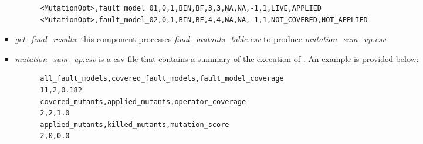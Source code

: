\begin{itemize}
\begin{itemize}
\begin{itemize}
      \begin{lstlisting}
      <MutationOpt>,fault_model_01,0,1,BIN,BF,3,3,NA,NA,-1,1,LIVE,APPLIED
      <MutationOpt>,fault_model_02,0,1,BIN,BF,4,4,NA,NA,-1,1,NOT_COVERED,NOT_APPLIED
      \end{lstlisting}

      \item \textit{get\_final\_results}: this component processes \textit{final\_mutants\_table.csv} to produce \textit{mutation\_sum\_up.csv}
      \item \textit{mutation\_sum\_up.csv} is a csv file that contains a summary of the execution of \dama.
      An example is provided below:

      \begin{lstlisting}
      all_fault_models,covered_fault_models,fault_model_coverage
      11,2,0.182
      covered_mutants,applied_mutants,operator_coverage
      2,2,1.0
      applied_mutants,killed_mutants,mutation_score
      2,0,0.0
      \end{lstlisting}

    \end{itemize}
  \end{itemize}

\end{itemize}
\clearpage


